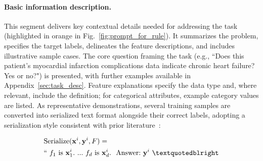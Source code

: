 \vspace*{-0.12in}
\paragraph{Basic information description.} This segment delivers key contextual details needed for addressing the task (highlighted in orange in Fig.~\ref{fig:prompt_for_rule}). It summarizes the problem, specifies the target labels, delineates the feature descriptions, and includes illustrative sample cases. The core question framing the task (e.g., ``Does this patient's myocardial infarction complications data indicate chronic heart failure? Yes or no?") is presented, with further examples available in Appendix~\ref{sec:task_desc}. Feature explanations specify the data type and, where relevant, include the definition; for categorical attributes, example category values are listed. As representative demonstrations, several training samples are converted into serialized text format alongside their correct labels, adopting a serialization style consistent with prior literature~\cite{dinh2022lift,hegselmann2023tabllm}:

\begin{align}
&\text{Serialize}(\mathbf{x}^i,\mathbf{y}^i, F) = \nonumber \\ 
&``\ f_1\ \text{is}\ \mathbf{x}^i_1.\ ... \ f_d\  \text{is}\  \mathbf{x}^i_d.\ \ \text{Answer:}\  \mathbf{y}^i\ ”
\end{align}

\vspace*{-0.12in}
